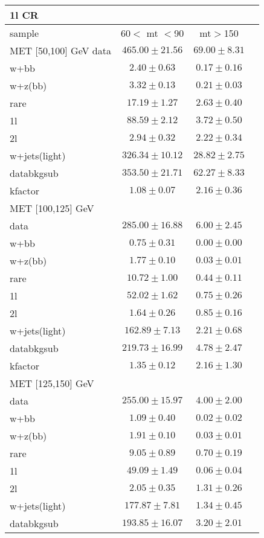 \begin{table}
\begin{center}
\small
\begin{tabular}{lccc}
\hline
1l CR   & &\\
\hline
sample&60$<$ mt $<$90&mt$>$150\\
\hline
MET [50,100] GeV\hline
data&$465.00\pm21.56$&$69.00\pm8.31$\\
\hline
w+bb&$2.40\pm0.63$&$0.17\pm0.16$\\
w+z(bb)&$3.32\pm0.13$&$0.21\pm0.03$\\
rare&$17.19\pm1.27$&$2.63\pm0.40$\\
1l&$88.59\pm2.12$&$3.72\pm0.50$\\
2l&$2.94\pm0.32$&$2.22\pm0.34$\\
w+jets(light)&$326.34\pm10.12$&$28.82\pm2.75$\\
\hline
databkgsub&$353.50\pm21.71$&$62.27\pm8.33$\\
kfactor&$1.08\pm0.07$&$2.16\pm0.36$\\
\hline\hline
\hline
MET [100,125] GeV  & &\\
\hline
data&$285.00\pm16.88$&$6.00\pm2.45$\\
\hline
w+bb&$0.75\pm0.31$&$0.00\pm0.00$\\
w+z(bb)&$1.77\pm0.10$&$0.03\pm0.01$\\
rare&$10.72\pm1.00$&$0.44\pm0.11$\\
1l&$52.02\pm1.62$&$0.75\pm0.26$\\
2l&$1.64\pm0.26$&$0.85\pm0.16$\\
w+jets(light)&$162.89\pm7.13$&$2.21\pm0.68$\\
\hline
databkgsub&$219.73\pm16.99$&$4.78\pm2.47$\\
kfactor&$1.35\pm0.12$&$2.16\pm1.30$\\
\hline\hline
\hline
MET [125,150] GeV  & &\\
\hline
data&$255.00\pm15.97$&$4.00\pm2.00$\\
\hline
w+bb&$1.09\pm0.40$&$0.02\pm0.02$\\
w+z(bb)&$1.91\pm0.10$&$0.03\pm0.01$\\
rare&$9.05\pm0.89$&$0.70\pm0.19$\\
1l&$49.09\pm1.49$&$0.06\pm0.04$\\
2l&$2.05\pm0.35$&$1.31\pm0.26$\\
w+jets(light)&$177.87\pm7.81$&$1.34\pm0.45$\\
\hline
databkgsub&$193.85\pm16.07$&$3.20\pm2.01$\\

\end{tabular}
\end{center}
\end{table}
